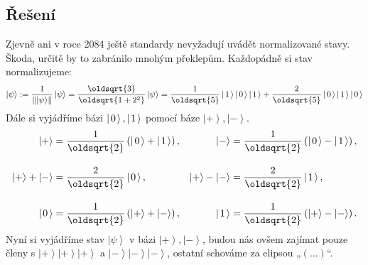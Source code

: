 \documentclass[10pt,a4paper]{article}
\newcommand*{\mask}[2]{%
    \mathord{\makebox[\widthof{\(#1\)}]{\(#2\)}}%
}
\newcommand{\norm}[1]{\left\lVert#1\right\rVert}
\newcommand{\ket}[1]{\left| #1 \right>}
\def\kzero{\ket{\mask{+}{0}}}
\def\kone{\ket{\mask{+}{1}}}
\def\kplus{\ket{+}}
\def\kminus{\ket{-}}
\begin{document}
\subsection{Řešení}
Zjevně ani v roce 2084 ještě standardy nevyžadují uvádět normalizované stavy. Škoda, určitě by to zabránilo mnohým překlepům. Každopádně si stav normalizujeme:
\begin{align*}
    \ket{\psi} := \frac{1}{\norm{\ket{\psi}}} \ket{\psi} = \frac{\oldsqrt{3}}{\oldsqrt{1+2^2}} \ket{\psi} = \frac{1}{\oldsqrt{5}} \kone\kzero\kone + \frac{2}{\oldsqrt{5}} \kzero\kone\kzero
\end{align*}
Dále si vyjádříme bázi $\kzero,\kone$ pomocí báze $\kplus,\kminus$.
\begin{align*}
    \kplus &= \frac{1}{\oldsqrt{2}} \left(\kzero + \kone\right),
    &
    \kminus &= \frac{1}{\oldsqrt{2}} \left(\kzero - \kone\right),
    \\[10pt]
    \kplus + \kminus &= \frac{2}{\oldsqrt{2}} \kzero,
    &
    \kplus - \kminus &= \frac{2}{\oldsqrt{2}} \kone,
    \\[10pt]
    \kzero &= \frac{1}{\oldsqrt{2}} \left(\kplus + \kminus\right),
    &
    \kone &= \frac{1}{\oldsqrt{2}} \left(\kplus - \kminus\right).
\end{align*}
Nyní si vyjádříme stav $\ket{\psi}$ v bázi $\kplus, \kminus$, budou nás ovšem zajímat pouze členy s $\kplus\kplus\kplus$ a $\kminus\kminus\kminus$, ostatní schováme za elipsou „$(\dots)$“.
\begingroup
\allowdisplaybreaks
\end{document}
